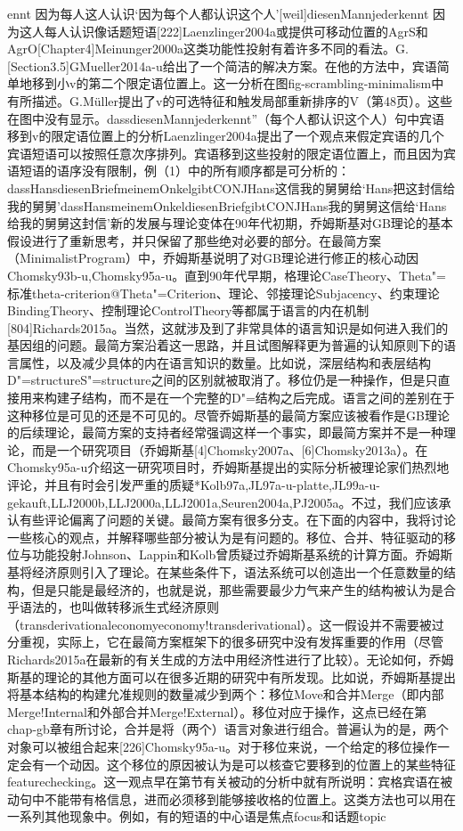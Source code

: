 ennt	因为每人这人认识`因为每个人都认识这个人'[weil]diesenMannjederkennt	因为这人每人认识像话题短语[222]Laenzlinger2004a或提供可移动位置的AgrS和AgrO[Chapter4]Meinunger2000a这类功能性投射有着许多不同的看法。G.[Section3.5]GMueller2014a-u给出了一个简洁的解决方案。在他的方法中，宾语简单地移到小v的第二个限定语位置上。这一分析在图fig-scrambling-minimalism中有所描述。G.Müller提出了v的可选特征和触发局部重新排序的V（第48页）。这些在图中没有显示。dassdiesenMannjederkennt”（每个人都认识这个人）句中宾语移到v的限定语位置上的分析Laenzlinger2004a提出了一个观点来假定宾语的几个宾语短语可以按照任意次序排列。宾语移到这些投射的限定语位置上，而且因为宾语短语的语序没有限制，例（1）中的所有顺序都是可分析的：dassHansdiesenBriefmeinemOnkelgibtCONJHans这信我的舅舅给`Hans把这封信给我的舅舅'dassHansmeinemOnkeldiesenBriefgibtCONJHans我的舅舅这信给`Hans给我的舅舅这封信'新的发展与理论变体在90年代初期，乔姆斯基对GB理论的基本假设进行了重新思考，并只保留了那些绝对必要的部分。在最简方案（MinimalistProgram）中，乔姆斯基说明了对GB理论进行修正的核心动因Chomsky93b-u,Chomsky95a-u。直到90年代早期，格理论CaseTheory、Theta"=标准theta-criterion@Theta"=Criterion、理论、邻接理论Subjacency、约束理论BindingTheory、控制理论ControlTheory等都属于语言的内在机制[804]Richards2015a。当然，这就涉及到了非常具体的语言知识是如何进入我们的基因组的问题。最简方案沿着这一思路，并且试图解释更为普遍的认知原则下的语言属性，以及减少具体的内在语言知识的数量。比如说，深层结构和表层结构D"=structureS"=structure之间的区别就被取消了。移位仍是一种操作，但是只直接用来构建子结构，而不是在一个完整的D"=结构之后完成。语言之间的差别在于这种移位是可见的还是不可见的。尽管乔姆斯基的最简方案应该被看作是GB理论的后续理论，最简方案的支持者经常强调这样一个事实，即最简方案并不是一种理论，而是一个研究项目（乔姆斯基[4]Chomsky2007a、[6]Chomsky2013a）。在Chomsky95a-u介绍这一研究项目时，乔姆斯基提出的实际分析被理论家们热烈地评论，并且有时会引发严重的质疑*Kolb97a,JL97a-u-platte,JL99a-u-gekauft,LLJ2000b,LLJ2000a,LLJ2001a,Seuren2004a,PJ2005a。不过，我们应该承认有些评论偏离了问题的关键。最简方案有很多分支。在下面的内容中，我将讨论一些核心的观点，并解释哪些部分被认为是有问题的。移位、合并、特征驱动的移位与功能投射Johnson、Lappin和Kolb曾质疑过乔姆斯基系统的计算方面。乔姆斯基将经济原则引入了理论。在某些条件下，语法系统可以创造出一个任意数量的结构，但是只能是最经济的，也就是说，那些需要最少力气来产生的结构被认为是合乎语法的，也叫做转移派生式经济原则（transderivationaleconomyeconomy!transderivational）。这一假设并不需要被过分重视，实际上，它在最简方案框架下的很多研究中没有发挥重要的作用（尽管Richards2015a在最新的有关生成的方法中用经济性进行了比较）。无论如何，乔姆斯基的理论的其他方面可以在很多近期的研究中有所发现。比如说，乔姆斯基提出将基本结构的构建允准规则的数量减少到两个：移位Move和合并Merge（即内部Merge!Internal和外部合并Merge!External）。移位对应于操作，这点已经在第chap-gb章有所讨论，合并是将（两个）语言对象进行组合。普遍认为的是，两个对象可以被组合起来[226]Chomsky95a-u。对于移位来说，一个给定的移位操作一定会有一个动因。这个移位的原因被认为是可以核查它要移到的位置上的某些特征featurechecking。这一观点早在第节有关被动的分析中就有所说明：宾格宾语在被动句中不能带有格信息，进而必须移到能够接收格的位置上。这类方法也可以用在一系列其他现象中。例如，有的短语的中心语是焦点focus和话题topic